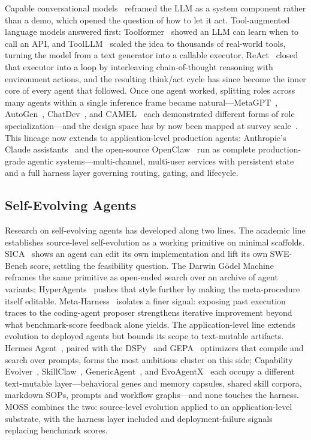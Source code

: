 \documentclass{article}
\begin{document}
Capable conversational models~\citep{achiam2023gpt} reframed the LLM as a system component rather than a demo, which opened the question of how to let it act. Tool-augmented language models answered first: Toolformer~\citep{schick2023toolformer} showed an LLM can learn when to call an API, and ToolLLM~\citep{qin2024toolllm} scaled the idea to thousands of real-world tools, turning the model from a text generator into a callable executor. ReAct~\citep{yao2022react} closed that executor into a loop by interleaving chain-of-thought reasoning with environment actions, and the resulting think/act cycle has since become the inner core of every agent that followed. Once one agent worked, splitting roles across many agents within a single inference frame became natural---MetaGPT~\citep{hong2024metagpt}, AutoGen~\citep{wu2024autogen}, ChatDev~\citep{qian2024chatdev}, and CAMEL~\citep{li2023camel} each demonstrated different forms of role specialization---and the design space has by now been mapped at survey scale~\citep{wang2024survey,guo2024large}. This lineage now extends to application-level production agents: Anthropic's Claude assistants~\citep{claude3-anthropic2024} and the open-source OpenClaw~\citep{openclaw-github} run as complete production-grade agentic systems---multi-channel, multi-user services with persistent state and a full harness layer governing routing, gating, and lifecycle. 
\subsection{Self-Evolving Agents}
\label{subsec:related-evolving}

Research on self-evolving agents has developed along two lines. The academic line establishes source-level self-evolution as a working primitive on minimal scaffolds. SICA~\citep{robeyns2025self} shows an agent can edit its own implementation and lift its own SWE-Bench score, settling the feasibility question. The Darwin G\"{o}del Machine~\citep{zhang2025darwin} reframes the same primitive as open-ended search over an archive of agent variants; HyperAgents~\citep{zhang2026hyperagents} pushes that style further by making the meta-procedure itself editable. Meta-Harness~\citep{lee2026meta} isolates a finer signal: exposing past execution traces to the coding-agent proposer strengthens iterative improvement beyond what benchmark-score feedback alone yields. The application-level line extends evolution to deployed agents but bounds its scope to text-mutable artifacts. Hermes Agent~\citep{hermes-github}, paired with the DSPy~\citep{khattab2023dspy} and GEPA~\citep{agrawal2025gepa} optimizers that compile and search over prompts, forms the most ambitious cluster on this side; Capability Evolver~\citep{wang2026procedural}, SkillClaw~\citep{ma2026skillclaw}, GenericAgent~\citep{liang2026genericagent}, and EvoAgentX~\citep{wang2025evoagentx} each occupy a different text-mutable layer---behavioral genes and memory capsules, shared skill corpora, markdown SOPs, prompts and workflow graphs---and none touches the harness. MOSS combines the two: source-level evolution applied to an application-level substrate, with the harness layer included and deployment-failure signals replacing benchmark scores.
\end{document}
